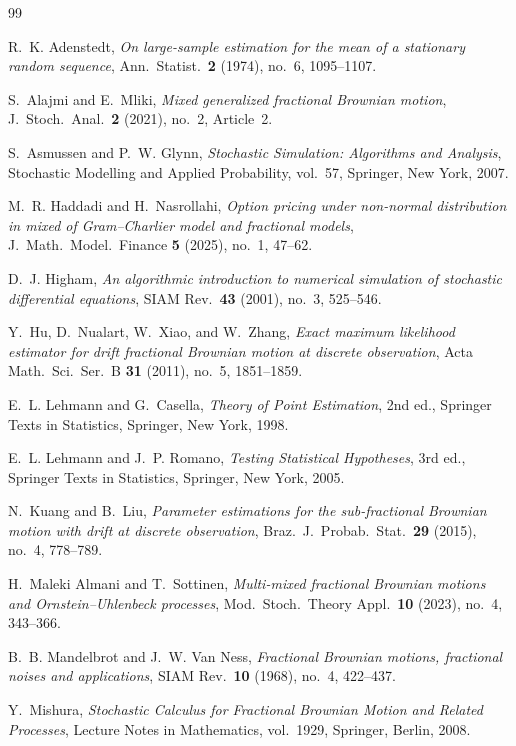 \documentclass[11pt,reqno]{amsart}
\numberwithin{equation}{section}
\theoremstyle{plain}
\theoremstyle{definition}
\theoremstyle{remark}
\begin{document}
\begin{thebibliography}{99}

R.~K. Adenstedt,
\emph{On large-sample estimation for the mean of a stationary random sequence},
Ann.\ Statist.\ \textbf{2} (1974), no.~6, 1095--1107.

S.~Alajmi and E.~Mliki,
\emph{Mixed generalized fractional Brownian motion},
J.\ Stoch.\ Anal.\ \textbf{2} (2021), no.~2, Article~2.

S.~Asmussen and P.~W. Glynn,
\emph{Stochastic Simulation: Algorithms and Analysis},
Stochastic Modelling and Applied Probability, vol.~57, Springer, New York, 2007.

M.~R. Haddadi and H.~Nasrollahi,
\emph{Option pricing under non-normal distribution in mixed of Gram--Charlier model and
fractional models},
J.\ Math.\ Model.\ Finance \textbf{5} (2025), no.~1, 47--62.

D.~J. Higham,
\emph{An algorithmic introduction to numerical simulation of stochastic differential
equations},
SIAM Rev.\ \textbf{43} (2001), no.~3, 525--546.

Y.~Hu, D.~Nualart, W.~Xiao, and W.~Zhang,
\emph{Exact maximum likelihood estimator for drift fractional Brownian motion at discrete
observation},
Acta Math.\ Sci.\ Ser.\ B \textbf{31} (2011), no.~5, 1851--1859.

E.~L. Lehmann and G.~Casella,
\emph{Theory of Point Estimation}, 2nd ed.,
Springer Texts in Statistics, Springer, New York, 1998.

E.~L. Lehmann and J.~P. Romano,
\emph{Testing Statistical Hypotheses}, 3rd ed.,
Springer Texts in Statistics, Springer, New York, 2005.

N.~Kuang and B.~Liu,
\emph{Parameter estimations for the sub-fractional Brownian motion with drift at discrete
observation},
Braz.\ J.\ Probab.\ Stat.\ \textbf{29} (2015), no.~4, 778--789.

H.~Maleki Almani and T.~Sottinen,
\emph{Multi-mixed fractional Brownian motions and Ornstein--Uhlenbeck processes},
Mod.\ Stoch.\ Theory Appl.\ \textbf{10} (2023), no.~4, 343--366.

B.~B. Mandelbrot and J.~W. Van Ness,
\emph{Fractional Brownian motions, fractional noises and applications},
SIAM Rev.\ \textbf{10} (1968), no.~4, 422--437.

Y.~Mishura,
\emph{Stochastic Calculus for Fractional Brownian Motion and Related Processes},
Lecture Notes in Mathematics, vol.~1929, Springer, Berlin, 2008.


\end{thebibliography}
\end{document}
